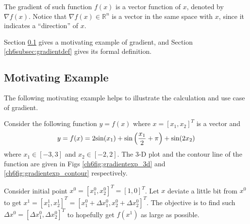The gradient of such function $f(x)$ is a vector function of $x$, denoted by $\nabla f(x)$. Notice that $\nabla f(x) \in \mathbb{R}^n$ is a vector in the same space with $x$, since it indicates a ``direction'' of $x$.

Section \ref{ch6subsec:gradientmotivatingexp} gives a motivating example of gradient, and Section \ref{ch6subsec:gradientdef} gives its formal definition.

\subsection{Motivating Example} \label{ch6subsec:gradientmotivatingexp}

The following motivating example helps to illustrate the calculation and use case of gradient.

\begin{shortbox}

Consider the following function $y=f(x)$ where $x = [x_1,x_2]^T$ is a vector and
\begin{eqnarray}
    y = f(x) = 2\textup{sin}(x_1) + \textup{sin}\left(\dfrac{x_1}{2} + \pi\right) + \textup{sin}(2x_2) \label{ch6eq:gradientexp_hill}
\end{eqnarray}
where $x_1\in[-3,3]$ and $x_2\in[-2,2]$. The 3-D plot and the contour line of the function are given in Figs \ref{ch6fig:gradientexp_3d} and \ref{ch6fig:gradientexp_contour} respectively.

Consider initial point $x^0 = [x_1^0, x_2^0]^T = [1,0]^T$. Let $x$ deviate a little bit from $x^0$ to get $x^1 = [x_1^1, x_2^1]^T = [x_1^0 + \Delta x_1^0, x_2^0 + \Delta x_2^0]^T$. The objective is to find such $\Delta x^0 = [\Delta x_1^0, \Delta x_2^0]^T$ to hopefully get $f(x^1)$ as large as possible.

\end{shortbox}

